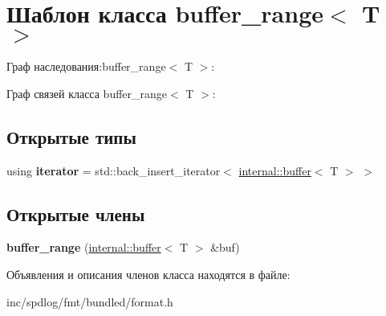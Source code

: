 \hypertarget{classbuffer__range}{}\section{Шаблон класса buffer\+\_\+range$<$ T $>$}
\label{classbuffer__range}


Граф наследования\+:buffer\+\_\+range$<$ T $>$\+:


Граф связей класса buffer\+\_\+range$<$ T $>$\+:
\subsection*{Открытые типы}
\begin{DoxyCompactItemize}
\item 
\mbox{\label{classbuffer__range_a08cc6c973d74ea67ef9d4cb00e3f7b8a}} 
using {\bfseries iterator} = std\+::back\+\_\+insert\+\_\+iterator$<$ \hyperlink{classinternal_1_1buffer}{internal\+::buffer}$<$ T $>$ $>$
\end{DoxyCompactItemize}
\subsection*{Открытые члены}
\begin{DoxyCompactItemize}
\item 
\mbox{\label{classbuffer__range_aec2e6560ad12941fc266b238c963ee50}} 
{\bfseries buffer\+\_\+range} (\hyperlink{classinternal_1_1buffer}{internal\+::buffer}$<$ T $>$ \&buf)
\end{DoxyCompactItemize}


Объявления и описания членов класса находятся в файле\+:\begin{DoxyCompactItemize}
\item 
inc/spdlog/fmt/bundled/format.\+h\end{DoxyCompactItemize}
